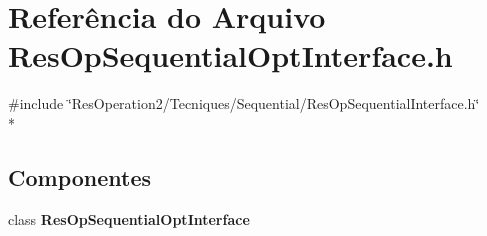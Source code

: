 \section{Referência do Arquivo Res\+Op\+Sequential\+Opt\+Interface.\+h}
\label{_res_op_sequential_opt_interface_8h}
{\ttfamily \#include \char`\"{}Res\+Operation2/\+Tecniques/\+Sequential/\+Res\+Op\+Sequential\+Interface.\+h\char`\"{}}\\*
\subsection*{Componentes}
\begin{DoxyCompactItemize}
\item 
class {\bf Res\+Op\+Sequential\+Opt\+Interface}
\end{DoxyCompactItemize}
